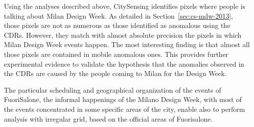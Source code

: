 Using the analyses described above, CitySensing identifies pixels where people is talking about Milan Design Week. As detailed in Section~\ref{sec:cs-mdw-2013}, those pixels are not as numerous as those identified as anomalous using the CDRs. However, they match with almost absolute precision the pixels in which Milan Design Week events happen. The most interesting finding is that almost all those pixels are contained in mobile anomalous ones. This provides further experimental evidence to validate the hypothesis that the anomalies observed in the CDRs are caused by the people coming to Milan for the Design Week.

The particular scheduling and geographical organization of the events of FuoriSalone, the informal happenings of the Milano Design Week, with most of the events concentrated in some specific areas of the city, enable also to perform analysis with irregular \textsf{grid}, based on the official areas of Fuorisalone.



